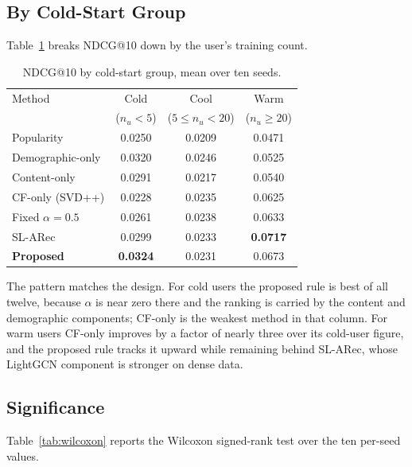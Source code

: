 \documentclass[conference]{IEEEtran}
\begin{document}
\subsection{By Cold-Start Group}

Table~\ref{tab:groups} breaks NDCG@10 down by the user's training
count.

\begin{table}[t]
\caption{NDCG@10 by cold-start group, mean over ten seeds.}
\label{tab:groups}
\centering
\begin{tabular}{lccc}
\toprule
Method & Cold & Cool & Warm \\
       & ($n_u<5$) & ($5\!\le\! n_u\!<\!20$) & ($n_u \ge 20$) \\
\midrule
Popularity          & 0.0250 & 0.0209 & 0.0471 \\
Demographic-only    & 0.0320 & 0.0246 & 0.0525 \\
Content-only        & 0.0291 & 0.0217 & 0.0540 \\
CF-only (SVD++)     & 0.0228 & 0.0235 & 0.0625 \\
Fixed $\alpha=0.5$  & 0.0261 & 0.0238 & 0.0633 \\
SL-ARec \cite{slarec2026} & 0.0299 & 0.0233 & \textbf{0.0717} \\
\textbf{Proposed}   & \textbf{0.0324} & 0.0231 & 0.0673 \\
\bottomrule
\end{tabular}
\end{table}

The pattern matches the design. For cold users the proposed rule is
best of all twelve, because $\alpha$ is near zero there and the
ranking is carried by the content and demographic components; CF-only
is the weakest method in that column. For warm users CF-only improves
by a factor of nearly three over its cold-user figure, and the
proposed rule tracks it upward while remaining behind SL-ARec, whose
LightGCN component is stronger on dense data.

\subsection{Significance}

Table~\ref{tab:wilcoxon} reports the Wilcoxon signed-rank test over
the ten per-seed values.
\end{document}

